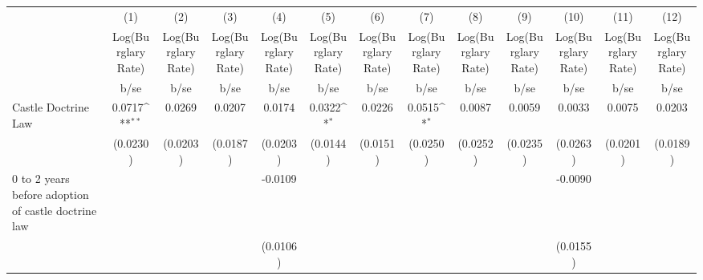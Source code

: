 {
\def\sym#1{\ifmmode^{#1}\else\(^{#1}\)\fi}
\begin{tabular}{l*{12}{c}}
\hline\hline
                    &\multicolumn{1}{c}{(1)}&\multicolumn{1}{c}{(2)}&\multicolumn{1}{c}{(3)}&\multicolumn{1}{c}{(4)}&\multicolumn{1}{c}{(5)}&\multicolumn{1}{c}{(6)}&\multicolumn{1}{c}{(7)}&\multicolumn{1}{c}{(8)}&\multicolumn{1}{c}{(9)}&\multicolumn{1}{c}{(10)}&\multicolumn{1}{c}{(11)}&\multicolumn{1}{c}{(12)}\\
                    &\multicolumn{1}{c}{Log(Burglary Rate)}&\multicolumn{1}{c}{Log(Burglary Rate)}&\multicolumn{1}{c}{Log(Burglary Rate)}&\multicolumn{1}{c}{Log(Burglary Rate)}&\multicolumn{1}{c}{Log(Burglary Rate)}&\multicolumn{1}{c}{Log(Burglary Rate)}&\multicolumn{1}{c}{Log(Burglary Rate)}&\multicolumn{1}{c}{Log(Burglary Rate)}&\multicolumn{1}{c}{Log(Burglary Rate)}&\multicolumn{1}{c}{Log(Burglary Rate)}&\multicolumn{1}{c}{Log(Burglary Rate)}&\multicolumn{1}{c}{Log(Burglary Rate)}\\
                    &        b/se         &        b/se         &        b/se         &        b/se         &        b/se         &        b/se         &        b/se         &        b/se         &        b/se         &        b/se         &        b/se         &        b/se         \\
\hline
Castle Doctrine Law &      0.0717\sym{**} &      0.0269         &      0.0207         &      0.0174         &      0.0322\sym{*}  &      0.0226         &      0.0515\sym{*}  &      0.0087         &      0.0059         &      0.0033         &      0.0075         &      0.0203         \\
                    &    (0.0230)         &    (0.0203)         &    (0.0187)         &    (0.0203)         &    (0.0144)         &    (0.0151)         &    (0.0250)         &    (0.0252)         &    (0.0235)         &    (0.0263)         &    (0.0201)         &    (0.0189)         \\
0 to 2 years before adoption of castle doctrine law&                     &                     &                     &     -0.0109         &                     &                     &                     &                     &                     &     -0.0090         &                     &                     \\
                    &                     &                     &                     &    (0.0106)         &                     &                     &                     &                     &                     &    (0.0155)         &                     &                     \\
\hline\hline
\end{tabular}
}
